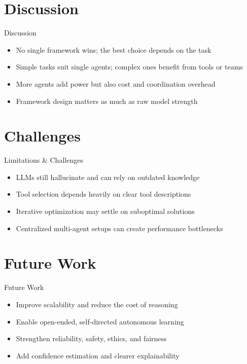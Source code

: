 \documentclass[10pt]{beamer}
\begin{document}
\section{Discussion}
\begin{frame}{Discussion}
\begin{itemize}
  \item No single framework wins; the best choice depends on the task
  \item Simple tasks suit single agents; complex ones benefit from tools or teams
  \item More agents add power but also cost and coordination overhead
  \item Framework design matters as much as raw model strength
\end{itemize}
\end{frame}
\section{Challenges}
\begin{frame}{Limitations \& Challenges}
\begin{itemize}
  \item LLMs still hallucinate and can rely on outdated knowledge
  \item Tool selection depends heavily on clear tool descriptions
  \item Iterative optimization may settle on suboptimal solutions
  \item Centralized multi-agent setups can create performance bottlenecks
\end{itemize}
\end{frame}
\section{Future Work}
\begin{frame}{Future Work}
\begin{itemize}
  \item Improve scalability and reduce the cost of reasoning
  \item Enable open-ended, self-directed autonomous learning
  \item Strengthen reliability, safety, ethics, and fairness
  \item Add confidence estimation and clearer explainability
\end{itemize}
\end{frame}
\end{document}
